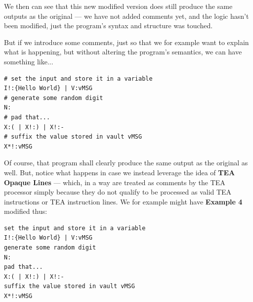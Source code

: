 \documentclass[a4paper, 18pt]{book} %
\begin{document}
{{{\begin{appendices}
\vspace{2em}


We then can see that this new modified version does still produce the same outputs as the original --- we have not added comments yet, and the logic hasn't been modified, just the program's syntax and structure was touched.

\vspace{2em}

But if we introduce some comments, just so that we for example want to explain what is happening, but without altering the program's semantics, we can have something like...


\vspace{2em}

  \begin{tcolorbox}[teaterminalstyle, title=TEA COMMENTS: Example 4: Program with comments, breakable]
  \begin{lstlisting}[language=TEA,breaklines=true,]
# set the input and store it in a variable
I!:{Hello World} | V:vMSG
# generate some random digit
N:
# pad that...
X:( | X!:) | X!:-
# suffix the value stored in vault vMSG
X*!:vMSG
   \end{lstlisting}
  \end{tcolorbox}

\vspace{2em}


Of course, that program shall clearly produce the same output as the original as well. But, notice what happens in case we instead leverage the idea of \textbf{TEA Opaque Lines} --- which, in a way are treated as comments by the TEA processor simply because they do not qualify to be processed as valid TEA instructions or TEA instruction lines. We for example might have \textbf{Example 4} modified thus:


\vspace{2em}

  \begin{tcolorbox}[teaterminalstyle, title=TEA COMMENTS: Example 5: Program with TOL, breakable]
  \begin{lstlisting}[language=TEA,breaklines=true,]
 set the input and store it in a variable
I!:{Hello World} | V:vMSG
generate some random digit
N:
pad that...
X:( | X!:) | X!:-
suffix the value stored in vault vMSG
X*!:vMSG
   \end{lstlisting}
  \end{tcolorbox}

\vspace{2em}



\end{appendices}}}}
\end{document}
